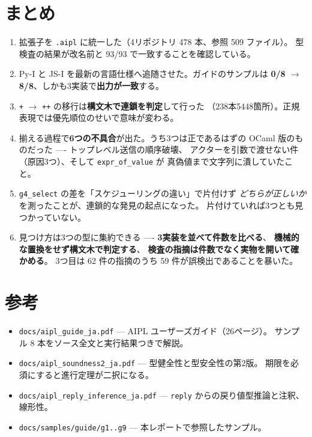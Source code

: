 \documentclass[11pt,a4paper]{ltjsarticle}
\begin{document}
\section{まとめ}

\begin{enumerate}
\item 拡張子を \texttt{.aipl} に統一した（4リポジトリ 478 本、参照 509 ファイル）。
  型検査の結果が改名前と 93/93 で一致することを確認している。

\item Py-I と JS-I を最新の言語仕様へ追随させた。ガイドのサンプルは
  \textbf{0/8 $\to$ 8/8}、しかも3実装で\textbf{出力が一致}する。

\item \verb|+| $\to$ \verb|++| の移行は\textbf{構文木で連鎖を判定}して行った
  （238本5448箇所）。正規表現では優先順位のせいで意味が変わる。

\item 揃える過程で\textbf{6つの不具合}が出た。うち3つは正であるはずの
  OCaml 版のものだった ---- トップレベル送信の順序破壊、
  アクターを引数で渡せない件（原因3つ）、そして \texttt{expr\_of\_value} が
  真偽値まで文字列に潰していたこと。

\item \texttt{g4\_select} の差を「スケジューリングの違い」で片付けず
  \emph{どちらが正しいか}を測ったことが、連鎖的な発見の起点になった。
  片付けていれば3つとも見つかっていない。

\item 見つけ方は3つの型に集約できる ----
  \textbf{3実装を並べて件数を比べる}、
  \textbf{機械的な置換をせず構文木で判定する}、
  \textbf{検査の指摘は件数でなく実物を開いて確かめる}。
  3つ目は 62 件の指摘のうち 59 件が誤検出であることを暴いた。
\end{enumerate}

\section*{参考}

\begin{itemize}
\item \texttt{docs/aipl\_guide\_ja.pdf} --- AIPL ユーザーズガイド（26ページ）。
  サンプル 8 本をソース全文と実行結果つきで解説。
\item \texttt{docs/aipl\_soundness2\_ja.pdf} --- 型健全性と型安全性の第2版。
  期限を必須にすると進行定理が二択になる。
\item \texttt{docs/aipl\_reply\_inference\_ja.pdf} ---
  \texttt{reply} からの戻り値型推論と注釈、線形性。
\item \texttt{docs/samples/guide/g1..g9} --- 本レポートで参照したサンプル。
\end{itemize}
\end{document}
